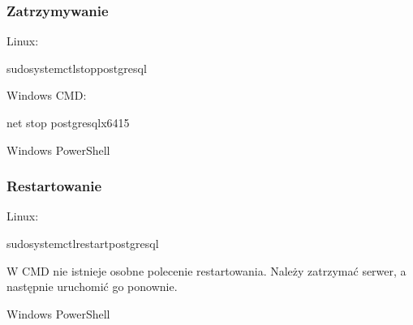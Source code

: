 \documentclass[letterpaper,10pt,polish]{sphinxmanual}
\begin{document}
\subsubsection{Zatrzymywanie}
\label{\detokenize{rozdzial2/Kontrola_i_konserwacja/kontrola_i_konserwacja:zatrzymywanie}}
\sphinxAtStartPar
Linux:

\begin{sphinxVerbatim}[commandchars=\\\{\}]
sudosystemctlstoppostgresql
\end{sphinxVerbatim}

\sphinxAtStartPar
Windows CMD:

\begin{sphinxVerbatim}[commandchars=\\\{\}]
net stop postgresql\PYGZhy{}x64\PYGZhy{}15
\end{sphinxVerbatim}

\sphinxAtStartPar
Windows PowerShell

\begin{sphinxVerbatim}[commandchars=\\\{\}]
  
\end{sphinxVerbatim}


\subsubsection{Restartowanie}
\label{\detokenize{rozdzial2/Kontrola_i_konserwacja/kontrola_i_konserwacja:restartowanie}}
\sphinxAtStartPar
Linux:

\begin{sphinxVerbatim}[commandchars=\\\{\}]
sudosystemctlrestartpostgresql
\end{sphinxVerbatim}

\sphinxAtStartPar
W CMD nie istnieje osobne polecenie restartowania. Należy zatrzymać serwer, a następnie uruchomić go ponownie.

\sphinxAtStartPar
Windows PowerShell

\begin{sphinxVerbatim}[commandchars=\\\{\}]
  
\end{sphinxVerbatim}
\end{document}
